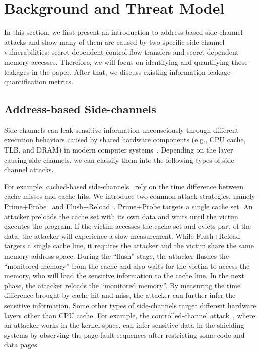 \section{Background and Threat Model}
In this section, we first present an introduction to address-based side-channel
attacks and show many of them are caused by two specific side-channel
vulnerabilities: secret-dependent control-flow transfers and secret-dependent
memory accesses. Therefore, we will focus on identifying and quantifying those
leakages in the paper. After that, we discuss existing information leakage quantification 
metrics.

\subsection{Address-based Side-channels}
Side channels can leak sensitive information
unconsciously through different execution behaviors caused by shared 
hardware components (e.g., CPU cache, TLB, and
DRAM) in modern computer systems~\cite{ge2018survey,szefer2019survey}. Depending
on the layer causing side-channels, we can classify them into the following
types of side-channel attacks.

For example, cached-based
side-channels~\cite{yarom2017cachebleed,191010,184415,7163050,Osvik2006,liu2015last,yarom2014flush+}
rely on the time difference between cache misses and cache hits. We introduce two
common attack strategies, namely Prime+Probe~\cite{liu2015last} and
Flush+Reload~\cite{yarom2014flush+}. Prime+Probe targets a single cache set. An
attacker preloads the cache set with its own data and waits until the victim
executes the program. If the victim accesses the cache set and evicts part of
the data, the attacker will experience a slow measurement. 
While Flush+Reload targets a
single cache line, it requires the attacker and the victim share the same memory
address space. During the ``flush'' stage, the attacker flushes the ``monitored
memory'' from the cache and also waits for the victim to access the memory,
who will load the sensitive information to the cache line. In the next phase,
the attacker reloads the ``monitored memory''. By measuring the time difference
brought by cache hit and miss, the attacker can further infer the sensitive information.
Some other types of side-channels target different hardware
layers other than CPU cache. For example, the controlled-channel
attack~\cite{7163052}, where an attacker works in the kernel space, can infer
sensitive data in the shielding systems by observing the page fault sequences
after restricting some code and data pages.

